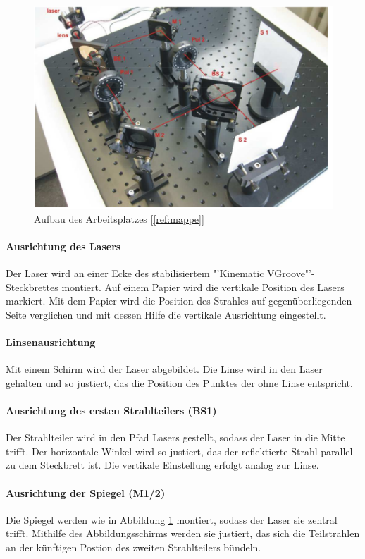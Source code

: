 \documentclass[a4paper,ngerman]{scrartcl}
\begin{document}
\begin{figure}
\includegraphics[width=\textwidth]{aufbau.png}
\caption{Aufbau des Arbeitsplatzes [\ref{ref:mappe}]}
\label{fig:aufbau}
\end{figure}


\paragraph{Ausrichtung des Lasers}
Der Laser wird an einer Ecke des stabilisiertem "'Kinematic VGroove"'-Steckbrettes montiert. 
Auf einem Papier wird die vertikale Position des Lasers markiert. 
Mit dem Papier wird die Position des Strahles auf gegenüberliegenden Seite verglichen und mit dessen Hilfe die vertikale Ausrichtung eingestellt.  

\paragraph{Linsenausrichtung}
Mit einem Schirm wird der Laser abgebildet. Die Linse wird in den Laser gehalten und so justiert, das die Position des Punktes der ohne Linse entspricht.

\paragraph{Ausrichtung des ersten Strahlteilers (BS1)}
Der Strahlteiler wird in den Pfad Lasers gestellt, sodass der Laser in die Mitte trifft. 
Der horizontale Winkel wird so justiert, das der reflektierte Strahl parallel zu dem Steckbrett ist. 
Die vertikale Einstellung erfolgt analog zur Linse.

\paragraph{Ausrichtung der Spiegel (M1/2)}
Die Spiegel werden wie in Abbildung \ref{fig:aufbau} montiert, sodass der Laser sie zentral trifft. 
Mithilfe des Abbildungsschirms werden sie justiert, das sich die Teilstrahlen an der künftigen Postion des zweiten Strahlteilers bündeln. 
\end{document}
